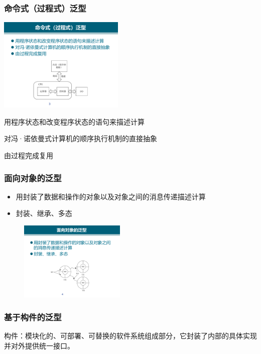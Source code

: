 \subsubsection{命令式（过程式）泛型}
\begin{table}
    \centering
    \vspace{-5.5em}
    \includegraphics[width=6cm]{images/命令式（过程式）泛型.pdf}
    \vspace{-5em}
\end{table}
用程序状态和改变程序状态的语句来描述计算

对冯·诺依曼式计算机的顺序执行机制的直接抽象

由过程完成复用

\subsubsection{面向对象的泛型}
\begin{itemize}
    \item 用封装了数据和操作的对象以及对象之间的消息传递描述计算
    \item 封装、继承、多态
\end{itemize}

\begin{figure}[H]
    \vspace{-0.5em}
	\centering
	\includegraphics[width=0.45\textwidth]{images/面向对象的泛型.pdf}
    \vspace{-1em}
\end{figure}

\subsubsection{基于构件的泛型}
构件：模块化的、可部署、可替换的软件系统组成部分，它封装了内部的具体实现并对外提供统一接口。

